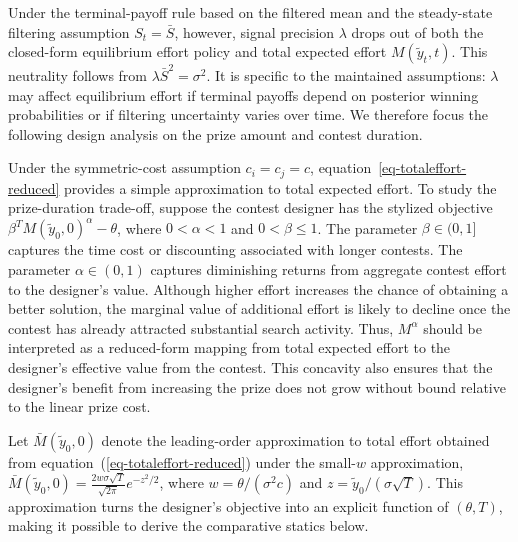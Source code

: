 \documentclass[mnsc]{informs3}
\begin{document}
Under the terminal-payoff rule based on the filtered mean and the steady-state filtering assumption \(S_t=\bar S\), however, signal precision \(\lambda\) drops out of both the closed-form equilibrium effort policy and total expected effort \(M(\tilde y_t,t)\). 
This neutrality follows from \(\lambda\bar S^2=\sigma^2\). 
It is specific to the maintained assumptions: 
\(\lambda\) may affect equilibrium effort if terminal payoffs depend on posterior winning probabilities or if filtering uncertainty varies over time. 
We therefore focus the following design analysis on the prize amount and contest duration.

Under the symmetric-cost assumption \(c_i=c_j=c\), equation~\eqref{eq-totaleffort-reduced} provides a simple approximation to total expected effort.
To study the prize-duration trade-off, suppose the contest designer has the stylized objective $\beta^{T}M(\tilde{y}_0,0)^\alpha-\theta$, where $0<\alpha<1$ and $0<\beta\leq 1$.
The parameter $\beta\in(0,1]$ captures the time cost or discounting associated
with longer contests.
The parameter $\alpha\in(0,1)$ captures diminishing returns from aggregate
contest effort to the designer's value.
Although higher effort increases the chance of obtaining a better solution, the marginal value of additional effort is likely to decline once the contest has already attracted substantial search
activity.
Thus, $M^\alpha$ should be interpreted as a reduced-form mapping from total expected effort to the designer's effective value from the contest.
This concavity also ensures that the designer's benefit from increasing the prize does not grow without bound relative to the linear prize cost.


Let $\bar{M}(\tilde y_0,0)$ denote the leading-order approximation to total effort obtained from equation~(\ref{eq-totaleffort-reduced}) under the small-$w$ approximation, $\bar{M}(\tilde y_0,0) = \frac{2w\sigma\sqrt{T}}{\sqrt{2\pi}}e^{-z^2/2}$, where $w=\theta/(\sigma^2c)$ and $z=\tilde y_0/(\sigma\sqrt{T})$.
This approximation turns the designer's objective into an explicit function of $(\theta,T)$, making it possible to derive the comparative statics below.
\end{document}
